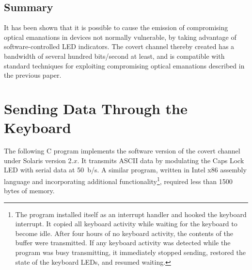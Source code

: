 \documentclass{acmtrans2e}
\begin{document}
\subsection{Summary}

It has been shown that it is possible to cause the emission of 
compromising optical emanations in devices not normally vulnerable, 
by taking advantage of software-controlled LED indicators.
The covert channel thereby 
created has a bandwidth of several hundred bits/second at least, and is 
compatible with standard techniques for exploiting compromising optical 
emanations described in the previous paper.

\section{Sending Data Through the Keyboard}\label{appendix:code}

The following C program implements the software version of the covert
channel under 
Solaris version 2.$x$.  It transmits ASCII data by modulating the Caps Lock LED
with serial data at 50~b/s.  A similar program, written in Intel
x86 assembly language and incorporating additional 
functionality\footnote{The program installed itself as an interrupt 
handler and hooked the keyboard interrupt.  It copied all keyboard 
activity while waiting for the keyboard to become idle.  After four 
hours of no keyboard activity, the contents of the buffer were
transmitted.  If any keyboard activity was detected while the program
was busy transmitting, it immediately stopped sending, restored the
state of the keyboard LEDs, and resumed waiting.}, required less than
1500 bytes of memory.
\end{document}
